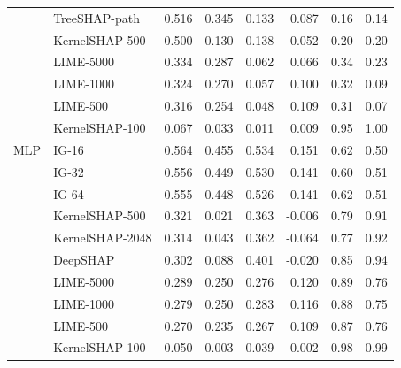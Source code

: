 \begin{table}[!htbp]
\begin{tabular}{llrrrrrr}
 & TreeSHAP-path & 0.516 & 0.345 & 0.133 & 0.087 & 0.16 & 0.14 \\
 & KernelSHAP-500 & 0.500 & 0.130 & 0.138 & 0.052 & 0.20 & 0.20 \\
 & LIME-5000 & 0.334 & 0.287 & 0.062 & 0.066 & 0.34 & 0.23 \\
 & LIME-1000 & 0.324 & 0.270 & 0.057 & 0.100 & 0.32 & 0.09 \\
 & LIME-500 & 0.316 & 0.254 & 0.048 & 0.109 & 0.31 & 0.07 \\
 & KernelSHAP-100 & 0.067 & 0.033 & 0.011 & 0.009 & 0.95 & 1.00 \\
\midrule
MLP & IG-16 & 0.564 & 0.455 & 0.534 & 0.151 & 0.62 & 0.50 \\
 & IG-32 & 0.556 & 0.449 & 0.530 & 0.141 & 0.60 & 0.51 \\
 & IG-64 & 0.555 & 0.448 & 0.526 & 0.141 & 0.62 & 0.51 \\
 & KernelSHAP-500 & 0.321 & 0.021 & 0.363 & -0.006 & 0.79 & 0.91 \\
 & KernelSHAP-2048 & 0.314 & 0.043 & 0.362 & -0.064 & 0.77 & 0.92 \\
 & DeepSHAP & 0.302 & 0.088 & 0.401 & -0.020 & 0.85 & 0.94 \\
 & LIME-5000 & 0.289 & 0.250 & 0.276 & 0.120 & 0.89 & 0.76 \\
 & LIME-1000 & 0.279 & 0.250 & 0.283 & 0.116 & 0.88 & 0.75 \\
 & LIME-500 & 0.270 & 0.235 & 0.267 & 0.109 & 0.87 & 0.76 \\
 & KernelSHAP-100 & 0.050 & 0.003 & 0.039 & 0.002 & 0.98 & 0.99 \\
\bottomrule
\end{tabular}
\end{table}

